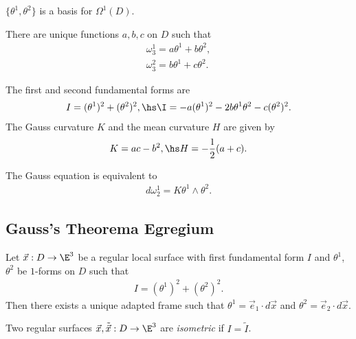 \documentclass{article}
\begin{document}
\begin{lemma}[Notes 11.3]
    $\{\theta^1, \theta^2\}$ is a basis for $\Omega^1(D)$. 
\end{lemma}

\begin{lemma}[Notes 11.4]
    There are unique functions $a,b,c$ on $D$ such that 
    \begin{align*}
        \omega_3^1 = a\theta^1+b\theta^2,\\
        \omega_3^2 = b\theta^1+c\theta^2.
    \end{align*}
\end{lemma}

\begin{proposition}[Notes 11.5]
    The first and second fundamental forms are 
    \begin{align*}
        I = (\theta^1)^2 + (\theta^2)^2,\hs 
        \I = -a(\theta^1)^2-2b\theta^1\theta^2-c(\theta^2)^2.
    \end{align*}
    The Gauss curvature $K$ and the mean curvature $H$ are given by 
    \begin{align*}
        K=ac-b^2, \hs H=-\frac{1}{2}(a+c).
    \end{align*}
\end{proposition}

\begin{proposition}
    The Gauss equation is equivalent to 
    \begin{align*}
        d\omega_2^1 = K\theta^1\wedge\theta^2.
    \end{align*}
\end{proposition}

\subsection{Gauss's Theorema Egregium}

\begin{proposition}
    Let $\vec x:D\to\E^3$ be a regular local surface with first fundamental form 
    $I$ and $\theta^1$, $\theta^2$ be $1$-forms on $D$ such that 
    \begin{align*}
        I = (\theta^1)^2+(\theta^2)^2.
    \end{align*}
    Then there exists a unique adapted frame such that $\theta^1=\vec e_1\cdot d\vec x$
    and $\theta^2 = \vec e_2 \cdot d\vec x$.
\end{proposition}

\begin{definition}
    Two regular surfaces $\vec x,\tilde{\vec x}:D\to\E^3$ are \emph{isometric}
    if $I=\tilde I$.
\end{definition}
\end{document}
